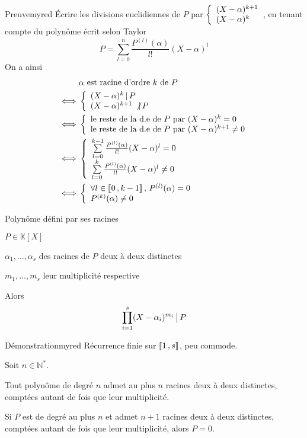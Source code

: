     \begin{demo}{Preuve}{myred}
        Écrire les divisions euclidiennes de $P$ par $\et{(X-\alpha)^{k+1}}{(X-\alpha)^k}$, en tenant compte du polynôme écrit selon Taylor 
            \[ P = \sum\limits_{l=0}^n \frac{P^{(l)}(\alpha)}{l!} (X-\alpha)^l \]
            On a ainsi \begin{align*}
                & \alpha \text{ est racine d’ordre } k \text{ de } P \\
                \iff & \et{(X-\alpha)^k \, | \, P}{(X - \alpha)^{k+1} \, \not| \, P} \\
                \iff & \et{\text{le reste de la d.e de } P \text{ par } (X-\alpha)^k = 0}{\text{le reste de la d.e de } P \text{ par } (X-\alpha)^{k+1} \neq 0} \\
                \iff & \et{\sum\limits_{l=0}^{k-1} \frac{P^{(l)}(\alpha)}{l!} (X-\alpha)^l = 0}{\sum\limits_{l=0}^{k} \frac{P^{(l)}(\alpha)}{l!} (X-\alpha)^l \neq 0} \\
                \iff & \et{\forall l \in \intervalleEntier{0}{k-1}, \, P^{(l)}(\alpha) = 0}{P^{(k)}(\alpha) \neq 0}
            \end{align*}
    \end{demo}

    \begin{theo}{Polynôme défini par ses racines}{}
        \begin{soient}
            \item $P \in \mathbb{K}[X]$
            \item $\alpha_1,\ldots,\alpha_s$ des racines de $P$ deux à deux distinctes
            \item $m_1,\ldots,m_s$ leur multiplicité respective
        \end{soient}
    
        Alors \[ \prod\limits_{i = 1}^s (X - \alpha_i)^{m_i} \, \big| \, P \] 
    \end{theo}
    
    \begin{demo}{Démonstration}{myred}
        Récurrence finie sur $\left\llbracket 1 \, , s \right\rrbracket$, peu commode.
    \end{demo}
    
    \begin{coro}{}{}
        Soit $n \in \mathbb{N}^*$. 
    
        \begin{alors}
            \item Tout polynôme de degré $n$ admet au plus $n$ racines deux à deux distinctes, comptées autant de fois que leur multiplicité.
            \item Si $P$ est de degré au plus $n$ et admet $n+1$ racines deux à deux distinctes, comptées autant de fois que leur multiplicité, alors $P = 0$.
        \end{alors}
    \end{coro}
    
